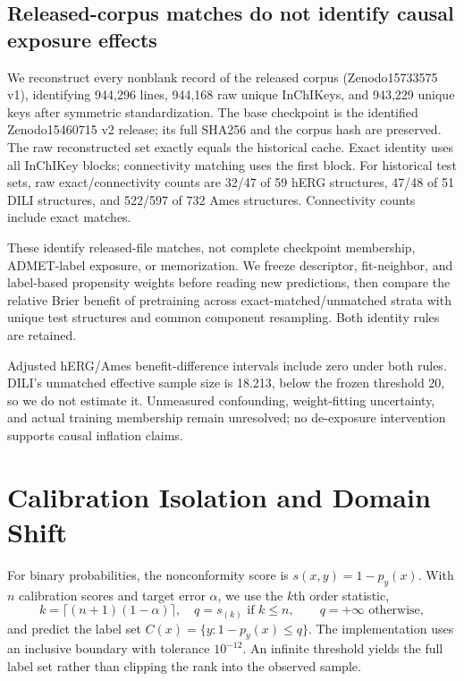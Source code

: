 \documentclass[runningheads,a4paper]{llncs}
\begin{document}
\subsection{Released-corpus matches do not identify causal exposure effects}
We reconstruct every nonblank record of the released corpus (Zenodo15733575 v1), identifying 944,296 lines, 944,168 raw unique InChIKeys, and 943,229 unique keys after symmetric standardization. The base checkpoint is the identified Zenodo15460715 v2 release; its full SHA256 and the corpus hash are preserved. The raw reconstructed set exactly equals the historical cache. Exact identity uses all InChIKey blocks; connectivity matching uses the first block. For historical test sets, raw exact/connectivity counts are 32/47 of 59 hERG structures, 47/48 of 51 DILI structures, and 522/597 of 732 Ames structures. Connectivity counts include exact matches.

These identify released-file matches, not complete checkpoint membership, ADMET-label exposure, or memorization. We freeze descriptor, fit-neighbor, and label-based propensity weights before reading new predictions, then compare the relative Brier benefit of pretraining across exact-matched/unmatched strata with unique test structures and common component resampling. Both identity rules are retained.

Adjusted hERG/Ames benefit-difference intervals include zero under both rules. DILI's unmatched effective sample size is 18.213, below the frozen threshold 20, so we do not estimate it. Unmeasured confounding, weight-fitting uncertainty, and actual training membership remain unresolved; no de-exposure intervention supports causal inflation claims.

\section{Calibration Isolation and Domain Shift}
For binary probabilities, the nonconformity score is $s(x,y)=1-p_y(x)$. With $n$ calibration scores and target error $\alpha$, we use the $k$th order statistic,
\begin{equation}
 k=\lceil(n+1)(1-\alpha)\rceil,\quad
 q=s_{(k)}\text{ if }k\leq n,\qquad q=+\infty\text{ otherwise},
\end{equation}
and predict the label set $C(x)=\{y:1-p_y(x)\leq q\}$. The implementation uses an inclusive boundary with tolerance $10^{-12}$. An infinite threshold yields the full label set rather than clipping the rank into the observed sample.
\end{document}
